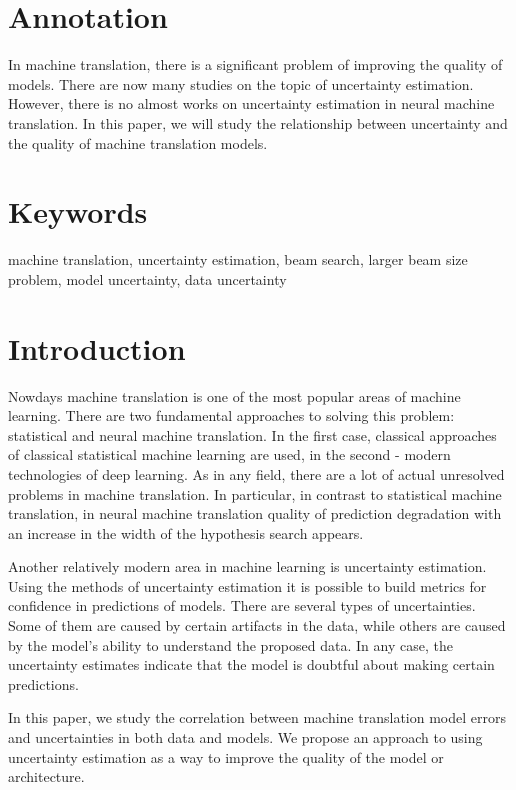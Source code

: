 \documentclass[a4paper,14pt]{extarticle}
\begin{document}
	\newpage

	{
		\hypersetup{linkcolor=black}
		\tableofcontents
	}

	\newpage
	
	\section{Annotation}
	In machine translation, there is a significant problem of improving the quality of models. There are now many studies on the topic of uncertainty estimation. However, there is no almost works on uncertainty estimation in neural machine translation. In this paper, we will study the relationship between uncertainty and the quality of machine translation models.
	\section{Keywords}
		machine translation, uncertainty estimation, beam search, larger beam size problem, model uncertainty, data uncertainty
		
	\section{Introduction}
	Nowdays machine translation is one of the most popular areas of machine learning. There are two fundamental approaches to solving this problem: statistical and neural machine translation. In the first case, classical approaches of classical statistical machine learning are used, in the second - modern technologies of deep learning. As in any field, there are a lot of actual unresolved problems in machine translation. In particular, in contrast to statistical machine translation, in neural machine translation  quality of prediction degradation with an increase in the width of the hypothesis search appears.
	
	Another relatively modern area in machine learning is uncertainty estimation. Using the methods of uncertainty estimation it is possible to build metrics for confidence in predictions of models. There are several types of uncertainties. Some of them are caused by certain artifacts in the data, while others are caused by the model's ability to understand the proposed data. In any case, the uncertainty estimates indicate that the model is doubtful about making certain predictions.	
	
	In this paper, we study the correlation between machine translation model errors and uncertainties in both data and models. We propose an approach to using uncertainty estimation as a way to improve the quality of the model or architecture.
\end{document}
